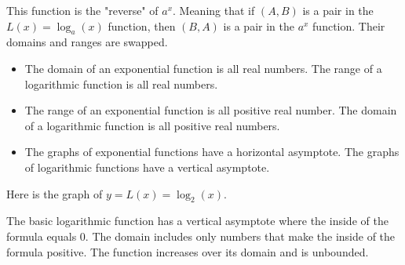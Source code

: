 \documentclass{ximera}
\begin{document}
This function is the "reverse" of $a^x$.  Meaning that if $(A, B)$ is a pair in the $L(x) = \log_a(x)$ function, then $(B, A)$ is a pair in the $a^x$ function. Their domains and ranges are swapped.


\begin{itemize}

\item The domain of an exponential function is all real numbers. The range of a logarithmic function is all real numbers.  


\item The range of an exponential function is all positive real number. The domain of a logarithmic function is all positive real numbers.

\item The graphs of exponential functions have a horizontal asymptote. The graphs of logarithmic functions have a vertical asymptote. 

\end{itemize}






Here is the graph of $y = L(x) = \log_2(x)$.

\begin{image}
\end{image}





The basic logarithmic function has a vertical asymptote where the inside of the formula equals $0$.  The domain includes only numbers that make the inside of the formula positive. The function increases over its domain and is unbounded.
\end{document}
